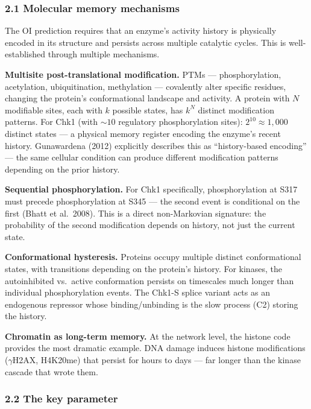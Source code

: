 \documentclass[
  11pt,
]{article}
\begin{document}
\hypertarget{molecular-memory-mechanisms}{%
\subsubsection{2.1 Molecular memory
mechanisms}\label{molecular-memory-mechanisms}}

The OI prediction requires that an enzyme's activity history is
physically encoded in its structure and persists across multiple
catalytic cycles. This is well-established through multiple mechanisms.

\textbf{Multisite post-translational modification.} PTMs ---
phosphorylation, acetylation, ubiquitination, methylation --- covalently
alter specific residues, changing the protein's conformational landscape
and activity. A protein with \(N\) modifiable sites, each with \(k\)
possible states, has \(k^N\) distinct modification patterns. For Chk1
(with \(\sim 10\) regulatory phosphorylation sites):
\(2^{10} \approx 1{,}000\) distinct states --- a physical memory
register encoding the enzyme's recent history. Gunawardena (2012)
explicitly describes this as ``history-based encoding'' --- the same
cellular condition can produce different modification patterns depending
on the prior history.

\textbf{Sequential phosphorylation.} For Chk1 specifically,
phosphorylation at S317 must precede phosphorylation at S345 --- the
second event is conditional on the first (Bhatt et al.~2008). This is a
direct non-Markovian signature: the probability of the second
modification depends on history, not just the current state.

\textbf{Conformational hysteresis.} Proteins occupy multiple distinct
conformational states, with transitions depending on the protein's
history. For kinases, the autoinhibited vs.~active conformation persists
on timescales much longer than individual phosphorylation events. The
Chk1-S splice variant acts as an endogenous repressor whose
binding/unbinding is the slow process (C2) storing the history.

\textbf{Chromatin as long-term memory.} At the network level, the
histone code provides the most dramatic example. DNA damage induces
histone modifications (\(\gamma\)H2AX, H4K20me) that persist for hours
to days --- far longer than the kinase cascade that wrote them.

\hypertarget{the-key-parameter}{%
\subsubsection{2.2 The key parameter}\label{the-key-parameter}}
\end{document}
